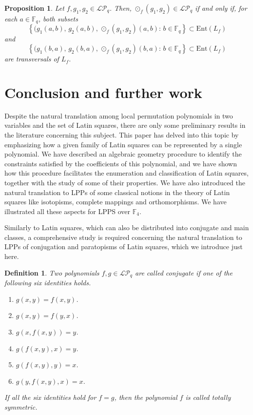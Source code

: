 \documentclass[pdflatex,sn-mathphys-num]{sn-jnl}
\theoremstyle{thmstyleone}%
\newtheorem{proposition}{Proposition}[section]
\newtheorem{definition}{Definition}[section]
\begin{document}
\begin{proposition}\label{proposition_hqp2} Let $f,g_1,g_2\in\mathcal{LP}_q$. Then, $\odot_f(g_1,g_2)\in\mathcal{LP}_q$ if and only if, for each $a\in\mathbb{F}_q$, both subsets
\[\left\{(g_1(a,b),\,g_2(a,b),\,\odot_f(g_1,g_2)(a,b)\colon\,b\in\mathbb{F}_q\right\}\subset \mathrm{Ent}(L_f)\]
and
\[\left\{(g_1(b,a),\,g_2(b,a),\,\odot_f(g_1,g_2)(b,a)\colon\,b\in\mathbb{F}_q\right\}\subset \mathrm{Ent}(L_f)\]
are transversals of $L_f$.
\end{proposition}

\section{Conclusion and further work}

Despite the natural translation among local permutation polynomials in two variables and the set of Latin squares, there are only some preliminary results in the literature concerning this subject. This paper has delved into this topic by emphasizing how a given family of Latin squares can be represented by a single polynomial. We have described an algebraic geometry procedure to identify the constraints satisfied by the coefficients of this polynomial, and we have shown how this procedure facilitates the enumeration and classification of Latin squares, together with the study of some of their properties. We have also introduced the natural translation to LPPs of some classical notions in the theory of Latin squares like isotopisms, complete mappings and orthomorphisms. We have illustrated all these aspects for LPPS over $\mathbb{F}_4$.



Similarly to Latin squares, which can also be distributed into conjugate and main classes, a comprehensive study is required concerning the natural translation to LPPs of conjugation and paratopisms of Latin squares, which we introduce just here.

\begin{definition}\label{definition_conjugate} Two polynomials $f,g\in\mathcal{LP}_q$ are called {\em conjugate} if one of the following six identities holds.
 \begin{enumerate}
\item $g(x,y)=f(x,y)$.

\item $g(x,y)=f(y,x)$.

\item $g(x,f(x,y))=y$.

\item $g(f(x,y),x)=y$.

\item $g(f(x,y),y)=x$.

\item $g(y,f(x,y),x)=x$.
\end{enumerate}
If all the six identities hold for $f = g$, then the polynomial $f$ is called {\em totally symmetric}.   
\end{definition}
\end{document}
